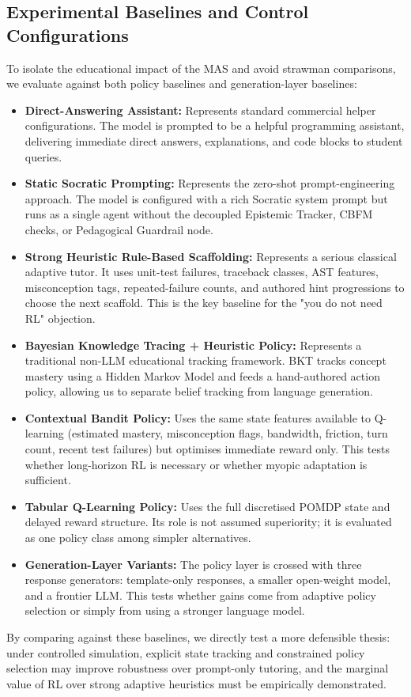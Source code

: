 \documentclass[11pt,a4paper]{report}
\begin{document}
\subsection{Experimental Baselines and Control Configurations}
To isolate the educational impact of the MAS and avoid strawman comparisons, we evaluate against both policy baselines and generation-layer baselines:
\begin{itemize}
    \item \textbf{Direct-Answering Assistant:} Represents standard commercial helper configurations. The model is prompted to be a helpful programming assistant, delivering immediate direct answers, explanations, and code blocks to student queries.
    \item \textbf{Static Socratic Prompting:} Represents the zero-shot prompt-engineering approach. The model is configured with a rich Socratic system prompt but runs as a single agent without the decoupled Epistemic Tracker, CBFM checks, or Pedagogical Guardrail node.
    \item \textbf{Strong Heuristic Rule-Based Scaffolding:} Represents a serious classical adaptive tutor. It uses unit-test failures, traceback classes, AST features, misconception tags, repeated-failure counts, and authored hint progressions to choose the next scaffold. This is the key baseline for the "you do not need RL" objection.
    \item \textbf{Bayesian Knowledge Tracing + Heuristic Policy:} Represents a traditional non-LLM educational tracking framework. BKT tracks concept mastery using a Hidden Markov Model and feeds a hand-authored action policy, allowing us to separate belief tracking from language generation.
    \item \textbf{Contextual Bandit Policy:} Uses the same state features available to Q-learning (estimated mastery, misconception flags, bandwidth, friction, turn count, recent test failures) but optimises immediate reward only. This tests whether long-horizon RL is necessary or whether myopic adaptation is sufficient.
    \item \textbf{Tabular Q-Learning Policy:} Uses the full discretised POMDP state and delayed reward structure. Its role is not assumed superiority; it is evaluated as one policy class among simpler alternatives.
    \item \textbf{Generation-Layer Variants:} The policy layer is crossed with three response generators: template-only responses, a smaller open-weight model, and a frontier LLM. This tests whether gains come from adaptive policy selection or simply from using a stronger language model.
\end{itemize}
By comparing against these baselines, we directly test a more defensible thesis: under controlled simulation, explicit state tracking and constrained policy selection may improve robustness over prompt-only tutoring, and the marginal value of RL over strong adaptive heuristics must be empirically demonstrated.
\end{document}
